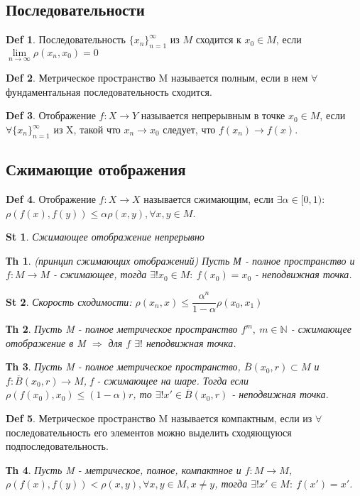 \documentclass[14pt]{article}
\theoremstyle{plain}
\newtheorem{Thm}{Тh}
\newtheorem{St}{St}
\theoremstyle{definition}
\newtheorem{Def}{Def}
\begin{document}
			\subsection{Последовательности}
				\begin{Def}
					Последовательность $\{x_n\}_{n=1}^{\infty}$ из $M$ сходится к $x_0 \in M$, если $\lim\limits_{n\to \infty} \rho(x_n, x_0) = 0$
				\end{Def}
				\begin{Def}
					Метрическое пространство M называется полным, если в нем $\forall$ фундаментальная последовательность сходится.			
				\end{Def}
				\begin{Def}
					Отображение $f: X \to Y$ называется непрерывным в точке $x_0 \in M$, если $\forall \{x_n\}_{n=1}^{\infty}$ из X, такой что $x_n \to x_0$ следует, что $f(x_n) \to f(x)$. 
				\end{Def}
				\subsection{Сжимающие отображения}
				\begin{Def}
					Отображение $f: X \to X$ называется сжимающим, если $\exists \alpha \in [0,1)$: $\rho(f(x), f(y)) \leq \alpha \rho(x,y), \forall x,y \in M$. 
				\end{Def}
				\begin{St}
					Сжимающее отображение непрерывно	
				\end{St}
				\begin{Thm}
					(принцип сжимающих отображений) \newline
					Пусть М - полное пространство и $f: M \to M$  - сжимающее, тогда $\exists! x_0 \in M: \ f(x_0) = x_0$ - неподвижная точка.
				\end{Thm}
				\begin{St}
					Скорость сходимости: $\rho(x_n, x) \leq \dfrac{\alpha^n}{1-\alpha} \rho(x_0, x_1)$	
				\end{St}
				\begin{Thm}
					Пусть M - полное метрическое пространство $f^m, \ m\in \mathbb{N}$ - сжимающее отображение в M $\Rightarrow$ для $f$ $\exists!$ неподвижная точка. 
				\end{Thm}
				\begin{Thm}
					Пусть M - полное метрическое пространство, $\overline{B}(x_0, r) \subset M$ и $f: \overline{B}(x_0, r) \to M$, f - сжимающее на шаре. Тогда если $\rho(f(x_0), x_0) \leq (1- \alpha) r$, то $\exists! x' \in \overline{B}(x_0, r)$ - неподвижная точка. 
				\end{Thm}
				\begin{Def}
					Метрическое пространство M называется компактным, если из $\forall$ последовательность его элементов можно выделить сходяющуюся подпоследовательность.	
				\end{Def}
				\begin{Thm}
					Пусть M - метрическое, полное, компактное и $f: M \to M$, $\rho(f(x), f(y)) < \rho(x,y), \forall x,y \in M, x \neq y$, тогда $\exists! x' \in M: \ f(x') = x'$. 
				\end{Thm}
\end{document}
